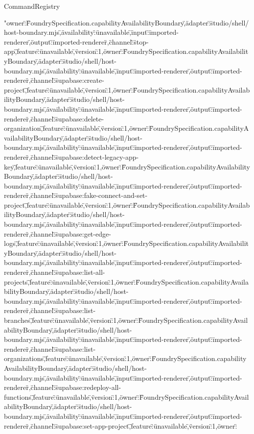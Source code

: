 \begin{lexlean}{CommandRegistry}
\begin{semanticmodule}
{"owner\":\"FoundrySpecification.capabilityAvailabilityBoundary\",\"adapter\":\"studio/shell/host-boundary.mjs\",\"availability\":\"unavailable\",\"input\":\"imported-renderer\",\"output\":\"imported-renderer\"},{\"channel\":\"stop-app\",\"feature\":\"unavailable\",\"version\":1,\"owner\":\"FoundrySpecification.capabilityAvailabilityBoundary\",\"adapter\":\"studio/shell/host-boundary.mjs\",\"availability\":\"unavailable\",\"input\":\"imported-renderer\",\"output\":\"imported-renderer\"},{\"channel\":\"supabase:create-project\",\"feature\":\"unavailable\",\"version\":1,\"owner\":\"FoundrySpecification.capabilityAvailabilityBoundary\",\"adapter\":\"studio/shell/host-boundary.mjs\",\"availability\":\"unavailable\",\"input\":\"imported-renderer\",\"output\":\"imported-renderer\"},{\"channel\":\"supabase:delete-organization\",\"feature\":\"unavailable\",\"version\":1,\"owner\":\"FoundrySpecification.capabilityAvailabilityBoundary\",\"adapter\":\"studio/shell/host-boundary.mjs\",\"availability\":\"unavailable\",\"input\":\"imported-renderer\",\"output\":\"imported-renderer\"},{\"channel\":\"supabase:detect-legacy-app-key\",\"feature\":\"unavailable\",\"version\":1,\"owner\":\"FoundrySpecification.capabilityAvailabilityBoundary\",\"adapter\":\"studio/shell/host-boundary.mjs\",\"availability\":\"unavailable\",\"input\":\"imported-renderer\",\"output\":\"imported-renderer\"},{\"channel\":\"supabase:fake-connect-and-set-project\",\"feature\":\"unavailable\",\"version\":1,\"owner\":\"FoundrySpecification.capabilityAvailabilityBoundary\",\"adapter\":\"studio/shell/host-boundary.mjs\",\"availability\":\"unavailable\",\"input\":\"imported-renderer\",\"output\":\"imported-renderer\"},{\"channel\":\"supabase:get-edge-logs\",\"feature\":\"unavailable\",\"version\":1,\"owner\":\"FoundrySpecification.capabilityAvailabilityBoundary\",\"adapter\":\"studio/shell/host-boundary.mjs\",\"availability\":\"unavailable\",\"input\":\"imported-renderer\",\"output\":\"imported-renderer\"},{\"channel\":\"supabase:list-all-projects\",\"feature\":\"unavailable\",\"version\":1,\"owner\":\"FoundrySpecification.capabilityAvailabilityBoundary\",\"adapter\":\"studio/shell/host-boundary.mjs\",\"availability\":\"unavailable\",\"input\":\"imported-renderer\",\"output\":\"imported-renderer\"},{\"channel\":\"supabase:list-branches\",\"feature\":\"unavailable\",\"version\":1,\"owner\":\"FoundrySpecification.capabilityAvailabilityBoundary\",\"adapter\":\"studio/shell/host-boundary.mjs\",\"availability\":\"unavailable\",\"input\":\"imported-renderer\",\"output\":\"imported-renderer\"},{\"channel\":\"supabase:list-organizations\",\"feature\":\"unavailable\",\"version\":1,\"owner\":\"FoundrySpecification.capabilityAvailabilityBoundary\",\"adapter\":\"studio/shell/host-boundary.mjs\",\"availability\":\"unavailable\",\"input\":\"imported-renderer\",\"output\":\"imported-renderer\"},{\"channel\":\"supabase:redeploy-all-functions\",\"feature\":\"unavailable\",\"version\":1,\"owner\":\"FoundrySpecification.capabilityAvailabilityBoundary\",\"adapter\":\"studio/shell/host-boundary.mjs\",\"availability\":\"unavailable\",\"input\":\"imported-renderer\",\"output\":\"imported-renderer\"},{\"channel\":\"supabase:set-app-project\",\"feature\":\"unavailable\",\"version\":1,\"owner\":}
\end{semanticmodule}
\end{lexlean}
